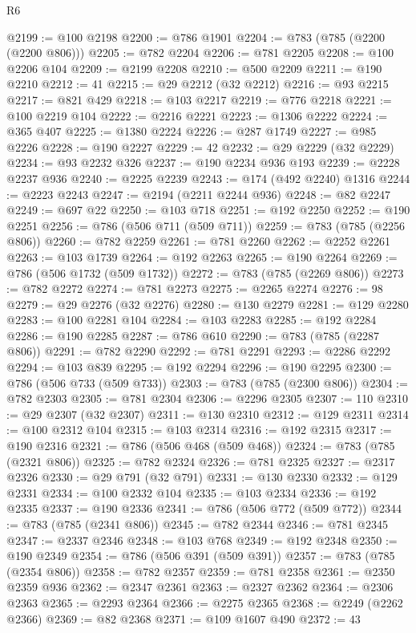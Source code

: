 \begin{lexlean}{R6}
\begin{coremodule}
@2199 := @100 @2198
@2200 := @786 @1901
@2204 := @783 (@785 (@2200 (@2200 @806)))
@2205 := @782 @2204
@2206 := @781 @2205
@2208 := @100 @2206 @104
@2209 := @2199 @2208
@2210 := @500 @2209
@2211 := @190 @2210
@2212 := 41
@2215 := @29 @2212 (@32 @2212)
@2216 := @93 @2215
@2217 := @821 @429
@2218 := @103 @2217
@2219 := @776 @2218
@2221 := @100 @2219 @104
@2222 := @2216 @2221
@2223 := @1306 @2222
@2224 := @365 @407
@2225 := @1380 @2224
@2226 := @287 @1749
@2227 := @985 @2226
@2228 := @190 @2227
@2229 := 42
@2232 := @29 @2229 (@32 @2229)
@2234 := @93 @2232 @326
@2237 := @190 @2234 @936 @193
@2239 := @2228 @2237 @936
@2240 := @2225 @2239
@2243 := @174 (@492 @2240) @1316
@2244 := @2223 @2243
@2247 := @2194 (@2211 @2244 @936)
@2248 := @82 @2247
@2249 := @697 @22
@2250 := @103 @718
@2251 := @192 @2250
@2252 := @190 @2251
@2256 := @786 (@506 @711 (@509 @711))
@2259 := @783 (@785 (@2256 @806))
@2260 := @782 @2259
@2261 := @781 @2260
@2262 := @2252 @2261
@2263 := @103 @1739
@2264 := @192 @2263
@2265 := @190 @2264
@2269 := @786 (@506 @1732 (@509 @1732))
@2272 := @783 (@785 (@2269 @806))
@2273 := @782 @2272
@2274 := @781 @2273
@2275 := @2265 @2274
@2276 := 98
@2279 := @29 @2276 (@32 @2276)
@2280 := @130 @2279
@2281 := @129 @2280
@2283 := @100 @2281 @104
@2284 := @103 @2283
@2285 := @192 @2284
@2286 := @190 @2285
@2287 := @786 @610
@2290 := @783 (@785 (@2287 @806))
@2291 := @782 @2290
@2292 := @781 @2291
@2293 := @2286 @2292
@2294 := @103 @839
@2295 := @192 @2294
@2296 := @190 @2295
@2300 := @786 (@506 @733 (@509 @733))
@2303 := @783 (@785 (@2300 @806))
@2304 := @782 @2303
@2305 := @781 @2304
@2306 := @2296 @2305
@2307 := 110
@2310 := @29 @2307 (@32 @2307)
@2311 := @130 @2310
@2312 := @129 @2311
@2314 := @100 @2312 @104
@2315 := @103 @2314
@2316 := @192 @2315
@2317 := @190 @2316
@2321 := @786 (@506 @468 (@509 @468))
@2324 := @783 (@785 (@2321 @806))
@2325 := @782 @2324
@2326 := @781 @2325
@2327 := @2317 @2326
@2330 := @29 @791 (@32 @791)
@2331 := @130 @2330
@2332 := @129 @2331
@2334 := @100 @2332 @104
@2335 := @103 @2334
@2336 := @192 @2335
@2337 := @190 @2336
@2341 := @786 (@506 @772 (@509 @772))
@2344 := @783 (@785 (@2341 @806))
@2345 := @782 @2344
@2346 := @781 @2345
@2347 := @2337 @2346
@2348 := @103 @768
@2349 := @192 @2348
@2350 := @190 @2349
@2354 := @786 (@506 @391 (@509 @391))
@2357 := @783 (@785 (@2354 @806))
@2358 := @782 @2357
@2359 := @781 @2358
@2361 := @2350 @2359 @936
@2362 := @2347 @2361
@2363 := @2327 @2362
@2364 := @2306 @2363
@2365 := @2293 @2364
@2366 := @2275 @2365
@2368 := @2249 (@2262 @2366)
@2369 := @82 @2368
@2371 := @109 @1607 @490
@2372 := 43

\end{coremodule}
\end{lexlean}
